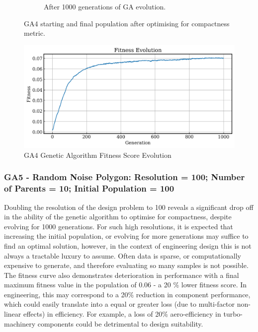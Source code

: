 \documentclass{article}
\begin{document}
\begin{figure}[H]
\begin{subfigure}[b]{0.45\textwidth}
        \caption{After 1000 generations of GA evolution.}
        \label{fig:GA4_final}
    \end{subfigure}
    \caption{GA4 starting and final population after optimising for compactness metric.}
    \label{fig:GA4_before_after_GA}
\end{figure}

\begin{figure}[H]
    \centering
    \includegraphics[width=0.75\linewidth]{figures/GAResults/GA4/1000gens_10pars_100initpop_5pcent_mut.png}
    \caption{GA4 Genetic Algorithm Fitness Score Evolution}
    \label{fig:GA4_fitness}
\end{figure}

\subsubsection*{GA5 - Random Noise Polygon: Resolution = 100; Number of Parents = 10; Initial Population = 100}
Doubling the resolution of the design problem to 100 reveals a significant drop off in the ability of the genetic algorithm to optimise for compactness, despite evolving for 1000 generations. For such high resolutions, it is expected that increasing the initial population, or evolving for more generations may suffice to find an optimal solution, however, in the context of engineering design this is not always a tractable luxury to assume. Often data is sparse, or computationally expensive to generate, and therefore evaluating so many samples is not possible.
The fitness curve also demonstrates deterioration in performance with a final maximum fitness value in the population of 0.06 - a 20 \% lower fitness score. In engineering, this may correspond to a 20\% reduction in component performance, which could easily translate into a equal or greater loss (due to multi-factor non-linear effects) in efficiency. For example, a loss of 20\% aero-efficiency in turbo-machinery components could be detrimental to design suitability.
\end{document}

